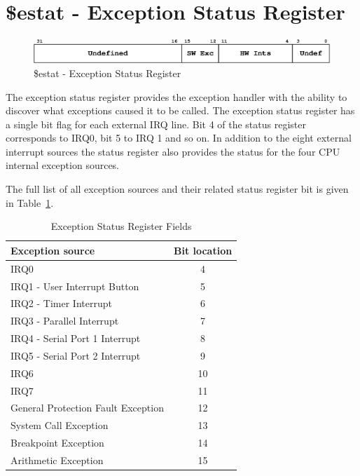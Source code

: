 \documentclass[a4paper,10pt]{article}
\begin{document}
\newpage
\section{\$estat - Exception Status Register}
\label{appen:estat}

\begin{figure}[h]
\begin{center}
\includegraphics[width=\textwidth]{estat.eps}
\caption{\$estat - Exception Status Register}
\label{estat_pic}
\end{center}
\end{figure}

The exception status register provides the exception handler with the
ability to discover what exceptions caused it to be called. The
exception status register has a single bit flag for each external IRQ
line. Bit 4 of the status register corresponds to IRQ0, bit 5 to IRQ 1
and so on. In addition to the eight external interrupt sources the
status register also provides the status for the four CPU internal
exception sources.

The full list of all exception sources and their related status
register bit is given in Table~\ref{table:sta_loc}.

\begin{table}[h]
\begin{center}
\begin{tabular}{|l|c|}
\hline
\textbf{Exception source} & \textbf{Bit location} \\
\hline
IRQ0 & 4 \\
\hline
IRQ1 - User Interrupt Button & 5 \\
\hline
IRQ2 - Timer Interrupt & 6 \\
\hline
IRQ3 - Parallel Interrupt & 7 \\
\hline
IRQ4 - Serial Port 1 Interrupt & 8 \\
\hline
IRQ5 - Serial Port 2 Interrupt & 9 \\
\hline
IRQ6 & 10 \\
\hline
IRQ7 & 11 \\
\hline
General Protection Fault Exception & 12 \\
\hline
System Call Exception & 13 \\
\hline
Breakpoint Exception & 14 \\
\hline
Arithmetic Exception & 15 \\
\hline
\end{tabular}
\caption{Exception Status Register Fields}
\label{table:sta_loc}
\end{center}
\end{table}
\end{document}
